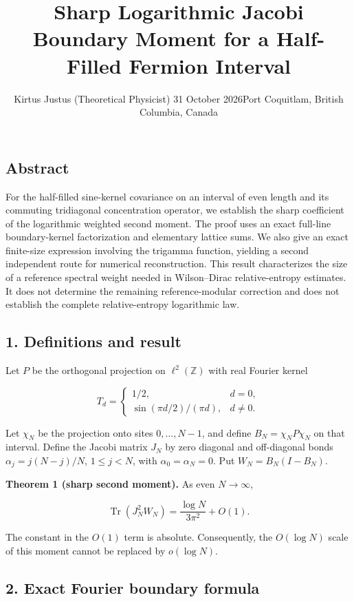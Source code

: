 \documentclass[
  10pt,
  a4paper,
]{article}
\title{Sharp Logarithmic Jacobi Boundary Moment for a Half-Filled Fermion Interval}
\author{Kirtus Justus (Theoretical Physicist) \textbullet{} 31 October 2026\tabularnewline Port Coquitlam, British Columbia, Canada}
\date{}
\begin{document}
\maketitle

\subsection{Abstract}\label{abstract}

For the half-filled sine-kernel covariance on an interval of even length and its commuting tridiagonal concentration operator, we establish the sharp coefficient of the logarithmic weighted second moment. The proof uses an exact full-line boundary-kernel factorization and elementary lattice sums. We also give an exact finite-size expression involving the trigamma function, yielding a second independent route for numerical reconstruction. This result characterizes the size of a reference spectral weight needed in Wilson--Dirac relative-entropy estimates. It does not determine the remaining reference-modular correction and does not establish the complete relative-entropy logarithmic law.

\subsection{1. Definitions and result}\label{definitions-and-result}

Let \(P\) be the orthogonal projection on \(\ell^2(\mathbb Z)\) with real Fourier kernel

\[
T_d=\begin{cases}1/2,&d=0,\\ \sin(\pi d/2)/(\pi d),&d\neq0.\end{cases}
\]

Let \(\chi_N\) be the projection onto sites \(0,\ldots,N-1\), and define \(B_N=\chi_NP\chi_N\) on that interval. Define the Jacobi matrix \(J_N\) by zero diagonal and off-diagonal bonds \(\alpha_j=j(N-j)/N\), \(1\le j<N\), with \(\alpha_0=\alpha_N=0\). Put \(W_N=B_N(I-B_N)\).

\textbf{Theorem 1 (sharp second moment).} As even \(N\to\infty\),

\[
\boxed{\operatorname{Tr}(J_N^2W_N)=\frac{\log N}{3\pi^2}+O(1).}
\]

The constant in the \(O(1)\) term is absolute. Consequently, the \(O(\log N)\) scale of this moment cannot be replaced by \(o(\log N)\).

\subsection{2. Exact Fourier boundary formula}\label{exact-fourier-boundary-formula}
\end{document}
